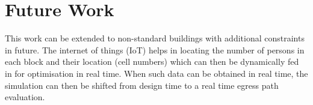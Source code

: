 \section{Future Work}

This work can be extended to non-standard buildings with additional constraints in future. The internet of things (IoT) helps in locating the number of persons in each block and their location (cell numbers) which can then be dynamically fed in for optimisation in real time. When such data can be obtained in real time, the simulation can then be shifted from design time to a real time egress path evaluation. 


 
